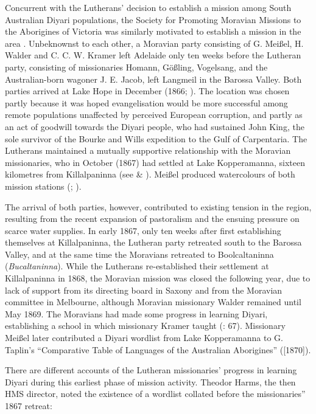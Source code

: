 Concurrent with the Lutherans' decision to establish a mission among South Australian Diyari populations, the Society for Promoting Moravian Missions to the Aborigines of Victoria was similarly motivated to establish a mission in the area \citep[209]{edwards_moravian_2007}. Unbeknownst to each other, a Moravian party consisting of G. Meißel, H. Walder and C. C. W. Kramer left Adelaide only ten weeks before the Lutheran party, consisting of missionaries Homann, Gößling, Vogelsang, and the Australian-born wagoner J. E. Jacob, left Langmeil in the Barossa Valley. Both parties arrived at Lake Hope in December (1866; \citealt[215--218]{edwards_moravian_2007}). The location was chosen partly because it was hoped evangelisation would be more successful among remote populations unaffected by perceived European corruption, and partly as an act of goodwill towards the Diyari people, who had sustained John King, the sole survivor of the Bourke and Wills expedition to the Gulf of Carpentaria. The Lutherans maintained a mutually supportive relationship with the Moravian missionaries, who in October (1867) had settled at Lake Kopperamanna, sixteen kilometres from Killalpaninna (see  \& ). Meißel produced watercolours of both mission stations (; ).

The arrival of both parties, however, contributed to existing tension in the region, resulting from the recent expansion of pastoralism and the ensuing pressure on scarce water supplies. In early 1867, only ten weeks after first establishing themselves at Killalpaninna, the Lutheran party retreated south to the Barossa Valley, and at the same time the Moravians retreated to Boolcaltaninna (\textit{Bucaltaninna}). While the Lutherans re-established their settlement at Killalpaninna in 1868, the Moravian mission was closed the following year, due to lack of support from its directing board in Saxony and from the Moravian committee in Melbourne, although Moravian missionary Walder remained until May 1869. The Moravians had made some progress in learning Diyari, establishing a school in which missionary Kramer taught (\citealt{proeve_work_1952}: 67). Missionary Meißel later contributed a Diyari wordlist from Lake Kopperamanna to G. Taplin’s “Comparative Table of Languages of the Australian Aborigines” (\citeyear{taplin_notes_1872}[1870]).

There are different accounts of the Lutheran missionaries' progress in learning Diyari during this earliest phase of mission activity. Theodor Harms, the then HMS director, noted the existence of a wordlist collated before the missionaries” 1867 retreat:

